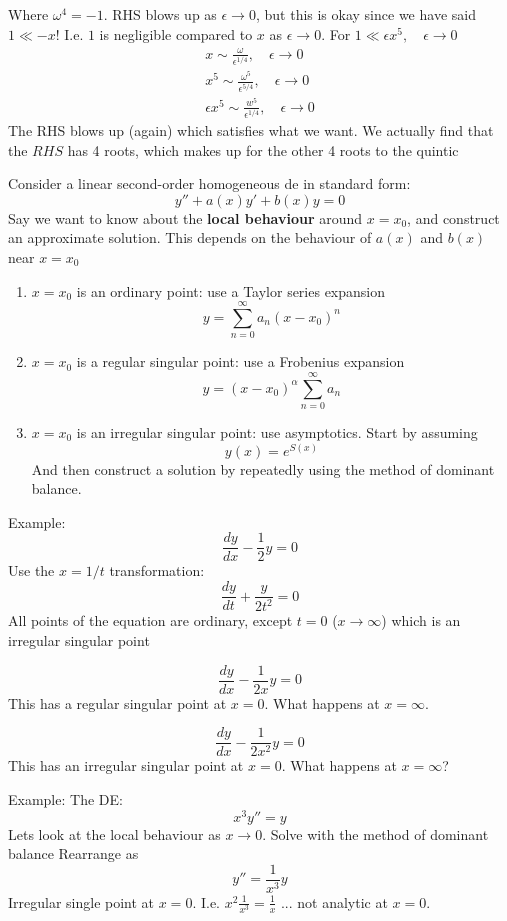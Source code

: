 \documentclass{/home/janmebows/Documents/LatexTemplates/myassignment}
\begin{document}
\begin{enumerate}
    Where $\omega^4 = -1$. RHS blows up as $\epsilon\to 0$, but this is okay since we have said $1\ll -x$! I.e. $1$ is negligible compared to $x$ as $\epsilon\to0$.
    For $1\ll \epsilon x^5, \quad \epsilon\to 0$
    \begin{align*}
         x \sim \frac{\omega}{\epsilon^{1/4}}, \quad \epsilon\to0\\
         x^5 \sim \frac{\omega^5}{\epsilon^{5/4}},\quad \epsilon\to0\\
         \epsilon x^5 \sim \frac{w^5}{\epsilon^{1/4}},\quad \epsilon\to 0
    \end{align*}
    The RHS blows up (again) which satisfies what we want.
    We actually find that the $RHS$ has 4 roots, which makes up for the other 4 roots to the quintic
    \end{enumerate}
    
    Consider a linear second-order homogeneous de in standard form:
    \[y'' + a(x)y' + b(x) y = 0\]
    Say we want to know about the \textbf{local behaviour} around $x=x_0$, and construct an approximate solution. This depends on the behaviour of $a(x)$ and $b(x)$ near $x=x_0$
    \begin{enumerate}
        \item $x=x_0$ is an ordinary point: use a Taylor series expansion
        \[y = \sum_{n=0}^\infty a_n(x-x_0)^n\]
        \item $x=x_0$ is a regular singular point: use a Frobenius expansion
        \[y = (x-x_0)^\alpha \sum_{n=0}^\infty a_n\]
        \item $x=x_0$ is an irregular singular point: use asymptotics. Start by assuming
        \[y(x) = e^{S(x)}\]
        And then construct a solution by repeatedly using the method of dominant balance.
    \end{enumerate}
    Example:
    \[\frac{dy}{dx} - \frac12 y = 0\]
    Use the $x=1/t$ transformation:
    \[\frac{dy}{dt} + \frac{y}{2t^2} = 0\]
    All points of the equation are ordinary, except $t=0$ ($x\to\infty$) which is an irregular singular point 
    
    \[\frac{dy}{dx} - \frac1{2x} y = 0\]
    This has a regular singular point at $x=0$. What happens at $x=\infty$.

    
    \[\frac{dy}{dx} - \frac{1}{2x^2} y =0 \]
    This has an irregular singular point at $x=0$. What happens at $x=\infty$?

    Example:
    The DE:
    \[x^3 y'' = y\]
    Lets look at the local behaviour as $x\to 0$. 
    Solve with the method of dominant balance
    Rearrange as
    \[y'' = \frac1{x^3} y\]
Irregular single point at $x=0$.
I.e. $x^2\frac{1}{x^3} = \frac1x$ ... not analytic at $x=0$.
\end{document}
